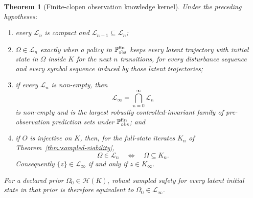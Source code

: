 \documentclass[11pt]{article}
\newtheorem{theorem}{Theorem}
\theoremstyle{definition}
\begin{document}
\begin{theorem}[Finite-clopen observation knowledge kernel]
\label{thm:finite-observation-viability}
Under the preceding hypotheses:
\begin{enumerate}
\item every $\mathcal L_n$ is compact and $\mathcal L_{n+1}\subseteq\mathcal L_n$;
\item $\Omega\in\mathcal L_n$ exactly when a policy in $\mathbb P_{\rm obs}^{\rm fin}$ keeps every latent trajectory with initial state in $\Omega$ inside $K$ for the next $n$ transitions, for every disturbance sequence and every symbol sequence induced by those latent trajectories;
\item if every $\mathcal L_n$ is non-empty, then
\begin{equation}
\mathcal L_\infty=\bigcap_{n=0}^{\infty}\mathcal L_n
\label{eq:finite-observation-kernel}
\end{equation}
is non-empty and is the largest robustly controlled-invariant family of pre-observation prediction sets under $\mathbb P_{\rm obs}^{\rm fin}$; and
\item if $O$ is injective on $K$, then, for the full-state iterates $K_n$ of Theorem~\ref{thm:sampled-viability},
\[
\Omega\in\mathcal L_n\quad\Longleftrightarrow\quad \Omega\subseteq K_n.
\]
Consequently $\{z\}\in\mathcal L_\infty$ if and only if $z\in K_\infty$.
\end{enumerate}
For a declared prior $\Omega_0\in\mathcal H(K)$, robust sampled safety for every latent initial state in that prior is therefore equivalent to $\Omega_0\in\mathcal L_\infty$.
\end{theorem}
\end{document}
